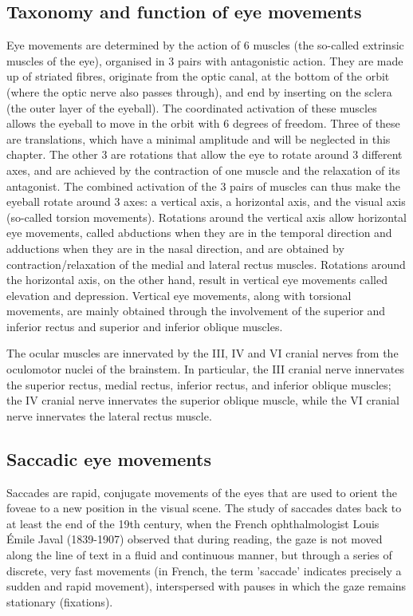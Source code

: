 \documentclass[11pt]{article}
\begin{document}
\subsection{Taxonomy and function of eye movements}
Eye movements are determined by the action of 6 muscles (the so-called extrinsic muscles of the eye), organised in 3 pairs with antagonistic action. They are made up of striated fibres, originate from the optic canal, at the bottom of the orbit (where the optic nerve also passes through), and end by inserting on the sclera (the outer layer of the eyeball). The coordinated activation of these muscles allows the eyeball to move in the orbit with 6 degrees of freedom. Three of these are translations, which have a minimal amplitude and will be neglected in this chapter. The other 3 are rotations that allow the eye to rotate around 3 different axes, and are achieved by the contraction of one muscle and the relaxation of its antagonist. The combined activation of the 3 pairs of muscles can thus make the eyeball rotate around 3 axes: a vertical axis, a horizontal axis, and the visual axis (so-called torsion movements). Rotations around the vertical axis allow horizontal eye movements, called abductions when they are in the temporal direction and adductions when they are in the nasal direction, and are obtained by contraction/relaxation of the medial and lateral rectus muscles. Rotations around the horizontal axis, on the other hand, result in vertical eye movements called elevation and depression. Vertical eye movements, along with torsional movements, are mainly obtained through the involvement of the superior and inferior rectus and superior and inferior oblique muscles.

The ocular muscles are innervated by the III, IV and VI cranial nerves from the oculomotor nuclei of the brainstem. In particular, the III cranial nerve innervates the superior rectus, medial rectus, inferior rectus, and inferior oblique muscles; the IV cranial nerve innervates the superior oblique muscle, while the VI cranial nerve innervates the lateral rectus muscle.

\subsection{Saccadic eye movements}
Saccades are rapid, conjugate movements of the eyes that are used to orient the foveae to a new position in the visual scene. The study of saccades dates back to at least the end of the 19th century, when the French ophthalmologist Louis Émile Javal (1839-1907) observed that during reading, the gaze is not moved along the line of text in a fluid and continuous manner, but through a series of discrete, very fast movements (in French, the term 'saccade' indicates precisely a sudden and rapid movement), interspersed with pauses in which the gaze remains stationary (fixations).
\end{document}
